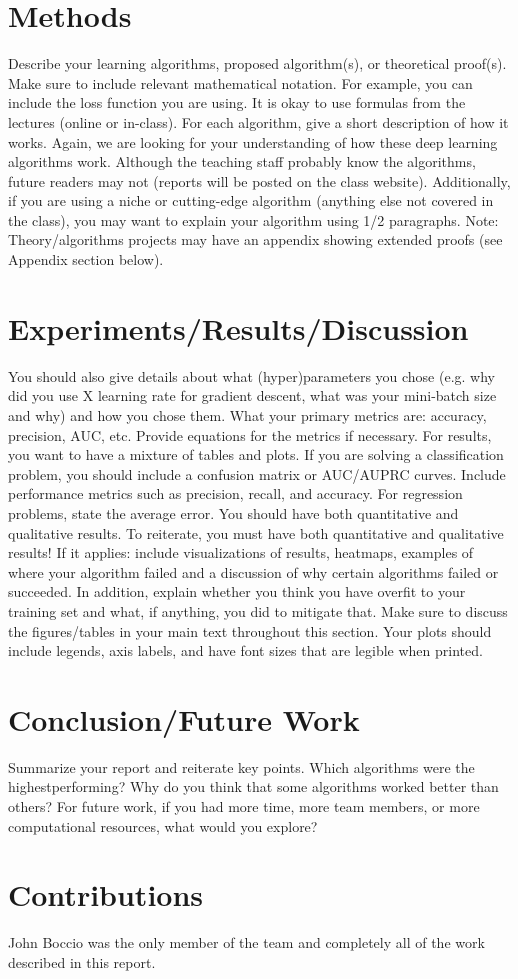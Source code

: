 \documentclass{article}
\begin{document}
\section{ Methods }
Describe your learning algorithms, proposed algorithm(s), or theoretical proof(s). Make
sure to include relevant mathematical notation. For example, you can include the loss function you are using. It is okay to use formulas from the lectures (online or in-class). For each algorithm, give a short description 
of how it works. Again, we are looking for your understanding of how these deep
learning algorithms work. Although the teaching staff probably know the algorithms, future
readers may not (reports will be posted on the class website). Additionally, if you are
using a niche or cutting-edge algorithm (anything else not covered in the class), you may want to explain your algorithm using 1/2
paragraphs. Note: Theory/algorithms projects may have an appendix showing extended
proofs (see Appendix section below).

\section{Experiments/Results/Discussion}
You should also give details about what (hyper)parameters you chose (e.g. why did you
use X learning rate for gradient descent, what was your mini-batch size and why) and how
you chose them. What your primary metrics are: accuracy, precision,
AUC, etc. Provide equations for the metrics if necessary. For results, you want to have a
mixture of tables and plots. If you are solving a classification problem, you should include a
confusion matrix or AUC/AUPRC curves. Include performance metrics such as precision,
recall, and accuracy. For regression problems, state the average error. You should have
both quantitative and qualitative results. To reiterate, you must have both quantitative
and qualitative results! If it applies: include visualizations of results, heatmaps,
examples of where your algorithm failed and a discussion of why certain algorithms failed
or succeeded. In addition, explain whether you think you have overfit to your training set
and what, if anything, you did to mitigate that. Make sure to discuss the figures/tables in
your main text throughout this section. Your plots should include legends, axis labels, and
have font sizes that are legible when printed.

\section{Conclusion/Future Work }
Summarize your report and reiterate key points. Which algorithms were the highestperforming?
Why do you think that some algorithms worked better than others? For
future work, if you had more time, more team members, or more computational resources,
what would you explore?

\section{Contributions}
John Boccio was the only member of the team and completely all of the work described in this report.



\end{document}
